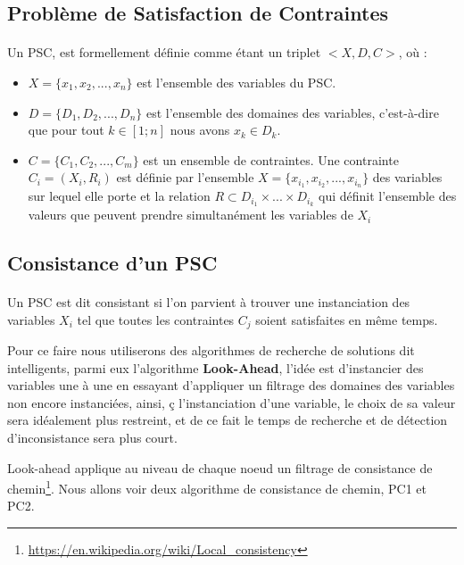 \documentclass[12pt]{report}
\begin{document}
	\subsection{Problème de Satisfaction de Contraintes}
	\paragraph{}
	Un PSC, est formellement définie comme étant un triplet $<X,D,C>$, où : 
	\begin{itemize}
		\item $X = \lbrace x_1,x_2,...,x_n\rbrace$ est l'ensemble des variables du PSC.
		\item $D = \lbrace D_1,D_2,...,D_n\rbrace$  est l'ensemble des domaines des variables, c'est-à-dire que pour tout $k\in [1;n]$ nous avons $x_k \in D_k$.
		\item $C = \lbrace C_1,C_2,...,C_m\rbrace$ est un ensemble de contraintes. Une contrainte $C_i = (X_i,R_i)$ est définie par l'ensemble $X = \lbrace x_{i_1},x_{i_2},...,x_{i_n} \rbrace$ des variables sur lequel elle porte et la relation $R \subset D_{i_1} \times ... \times D_{i_k}$ qui définit l'ensemble des valeurs que peuvent prendre simultanément les variables de $X_i$
	\end{itemize}
	
	\subsection{Consistance d'un PSC}
	\paragraph{}
	Un PSC est dit consistant si l'on parvient à trouver une instanciation des variables $X_i$ tel que toutes les 
	contraintes $C_j$ soient satisfaites en même temps.
	\par 
	Pour ce faire nous utiliserons des algorithmes de recherche de solutions dit intelligents, parmi eux l'algorithme
	\textbf{Look-Ahead}, l'idée est d'instancier des variables une à une en essayant d'appliquer un filtrage des domaines des
	variables non encore instanciées, ainsi, ç l'instanciation d'une variable, le choix de sa valeur sera idéalement 
	plus restreint, et de ce fait le temps de recherche et de détection d'inconsistance sera plus court.
	\par 
	Look-ahead applique au niveau de chaque noeud un filtrage de consistance de chemin\footnote{\url{https://en.wikipedia.org/wiki/Local_consistency}}. Nous allons voir deux algorithme de consistance 
	de chemin, PC1 et PC2.
\end{document}
